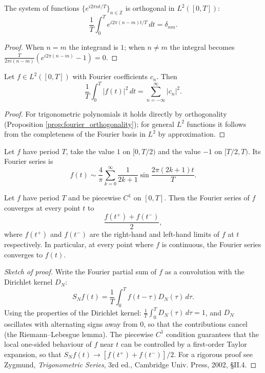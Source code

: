 \begin{proposition}\label{prop:fourier_orthogonality}
The system of functions $\{e^{i 2\pi n t / T}\}_{n \in \mathbb{Z}}$ is orthogonal in $L^2([0,T])$:
\[
\frac{1}{T}\int_0^T e^{i 2\pi (n-m) t / T}\,dt = \delta_{nm}.
\]
\end{proposition}

\begin{proof}
When $n = m$ the integrand is $1$; when $n \neq m$ the integral becomes $\frac{T}{2\pi i (n-m)}(e^{i 2\pi (n-m)} - 1) = 0$.
\end{proof}

\begin{theorem}\label{thm:parseval_fourier_classical}
Let $f \in L^2([0,T])$ with Fourier coefficients $c_n$. Then
\[
\frac{1}{T}\int_0^T |f(t)|^2\,dt = \sum_{n=-\infty}^{\infty} |c_n|^2.
\]
\end{theorem}

\begin{proof}
For trigonometric polynomials it holds directly by orthogonality (Proposition \ref{prop:fourier_orthogonality}); for general $L^2$ functions it follows from the completeness of the Fourier basis in $L^2$ by approximation.
\end{proof}

\begin{example}\label{ex:fourier_square_wave}
Let $f$ have period $T$, take the value $1$ on $[0, T/2)$ and the value $-1$ on $[T/2, T)$. Its Fourier series is
\[
f(t) \sim \frac{4}{\pi} \sum_{k=0}^{\infty} \frac{1}{2k+1} \sin\frac{2\pi (2k+1) t}{T}.
\]
\end{example}

\begin{theorem}\label{thm:dirichlet_convergence}
Let $f$ have period $T$ and be piecewise $C^1$ on $[0,T]$. Then the Fourier series of $f$ converges at every point $t$ to
\[
\frac{f(t^+) + f(t^-)}{2},
\]
where $f(t^+)$ and $f(t^-)$ are the right-hand and left-hand limits of $f$ at $t$ respectively. In particular, at every point where $f$ is continuous, the Fourier series converges to $f(t)$.
\end{theorem}

\begin{proof}[Sketch of proof]
Write the Fourier partial sum of $f$ as a convolution with the Dirichlet kernel $D_N$:
\[
S_N f(t) = \frac{1}{T}\int_0^T f(t - \tau) D_N(\tau)\,d\tau.
\]
Using the properties of the Dirichlet kernel: $\frac{1}{T}\int_0^T D_N(\tau)\,d\tau = 1$, and $D_N$ oscillates with alternating signs away from $0$, so that the contributions cancel (the Riemann--Lebesgue lemma). The piecewise $C^1$ condition guarantees that the local one-sided behaviour of $f$ near $t$ can be controlled by a first-order Taylor expansion, so that $S_N f(t) \to [f(t^+) + f(t^-)]/2$. For a rigorous proof see Zygmund, \textit{Trigonometric Series}, 3rd ed., Cambridge Univ. Press, 2002, \S{}II.4.
\end{proof}

